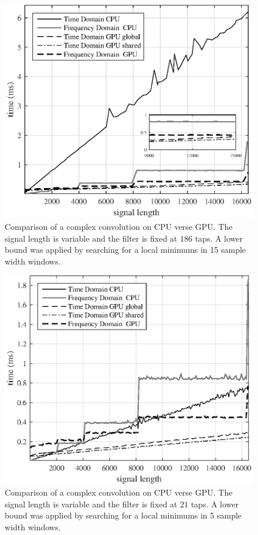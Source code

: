 \begin{figure}
	\centering\includegraphics[width=5in]{figures/gpu_intro/CPUvsGPU_1batch_186taps_varySignal.eps}
	\caption{Comparison of a complex convolution on CPU verse GPU. The signal length is variable and the filter is fixed at $186$ taps. A lower bound was applied by searching for a local minimums in 15 sample width windows.}
	\label{fig:CPUvsGPU_1batch_186taps_varySignal}
\end{figure}
\begin{figure}
	\centering\includegraphics[width=5in]{figures/gpu_intro/CPUvsGPU_1batch_21taps_varySignal.eps}
	\caption{Comparison of a complex convolution on CPU verse GPU. The signal length is variable and the filter is fixed at $21$ taps. A lower bound was applied by searching for a local minimums in 5 sample width windows.}
	\label{fig:CPUvsGPU_1batch_21taps_varySignal}
\end{figure}
